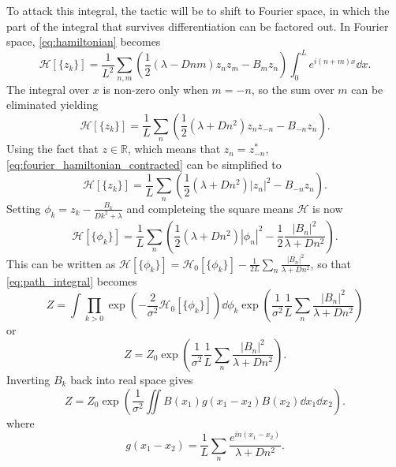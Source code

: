  To attack this integral, the tactic will be to shift to Fourier space, in which the part of the integral that survives differentiation can be factored out.
 In Fourier space, \cref{eq:hamiltonian} becomes
 \begin{equation}
   \label{eq:fourier_hamiltonian}
   \mathcal{H}[\{z_k\}] = \frac{1}{L^2}\sum_{n,m}\left(\frac{1}{2}\left(\lambda  - D nm\right) z_nz_m - B_mz_n\right)\int_0^L  e^{i(n+m)x}\dd{x}.
 \end{equation}
 The integral over $x$ is non-zero only when $m = -n$, so the sum over $m$ can be eliminated yielding
 \begin{equation}
   \label{eq:fourier_hamiltonian_contracted}
   \mathcal{H}[\{z_k\}] = \frac{1}{L}\sum_{n} \left(\frac{1}{2}\left(\lambda  + D n^2\right) z_nz_{-n} - B_{-n}z_{n}\right).
 \end{equation}
 Using the fact that $z \in \mathbb{R}$, which means that $z_n = z_{-n}^*$, \cref{eq:fourier_hamiltonian_contracted} can be simplified to
 \begin{equation}
   \label{eq:fourier_hamiltonian_contracted_mod}
   \mathcal{H}[\{z_k\}] = \frac{1}{L}\sum_{n} \left(\frac{1}{2}\left(\lambda  + D n^2\right) \left|z_n\right|^2- B_{-n}z_{n}\right).
 \end{equation}
 Setting $\phi_k = z_k - \frac{B_k}{Dk^2 + \lambda}$ and completeing the square means $\mathcal{H}$ is now
 \begin{equation}
   \label{eq:fourier_phi}
   \mathcal{H}[\{\phi_k\}] =  \frac{1}{L}\sum_{n} \left(\frac{1}{2}\left(\lambda + Dn^2\right) \left|\phi_n\right|^2 - \frac{1}{2}\frac{\left|B_n\right|^2}{\lambda + Dn^2}\right).
 \end{equation}
 This can be written as $\mathcal{H}[\{\phi_k\}] = \mathcal{H}_0[\{\phi_k\}] - \frac{1}{2L}\sum_{n}\frac{\left|B_n\right|^2}{\lambda + Dn^2}$, so that \cref{eq:path_integral} becomes
 \begin{equation}
   \label{eq:path_integral_factored}
   Z = \int \prod_{k>0} \exp \left(-\frac{2}{\sigma^2} \mathcal{H}_0[\{\phi_k\}]\right) \dd{\phi_k}\exp\left(\frac{1}{\sigma^2} \frac{1}{L}\sum_{n}\frac{\left|B_n\right|^2}{\lambda + Dn^2}\right)
 \end{equation}
 or
 \begin{equation}
   \label{eq:path_integral_factored_Z0}
   Z = Z_0 \exp\left(\frac{1}{\sigma^2} \frac{1}{L}\sum_{n}\frac{\left|B_n\right|^2}{\lambda + Dn^2}\right).
 \end{equation}
 Inverting $B_k$ back into real space gives
 \begin{equation}
   \label{eq:path_integral_factored_Z0_real}
   Z = Z_0 \exp\left(\frac{1}{\sigma^2} \iint B(x_1) g(x_1 - x_2) B(x_2) \dd{x_1}\dd{x_2}\right).
 \end{equation}
 where
 \begin{equation}
   \label{eq:G_from_Z}
   g(x_1 - x_2) =  \frac{1}{L}\sum_{n} \frac{e^{in(x_1-x_2)}}{\lambda + Dn^2}. 
 \end{equation}
 

